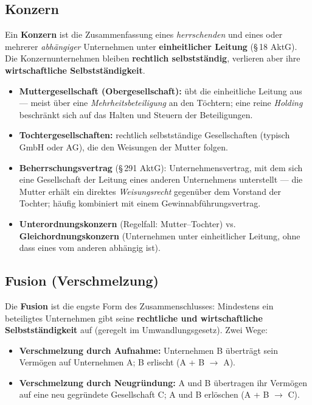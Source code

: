\documentclass[11pt, a4paper]{article}
\begin{document}
\subsection{Konzern}

Ein \textbf{Konzern} ist die Zusammenfassung eines \emph{herrschenden} und eines oder
mehrerer \emph{abhängiger} Unternehmen unter \textbf{einheitlicher Leitung}
(\S\,18 AktG). Die Konzernunternehmen bleiben \textbf{rechtlich selbstständig}, verlieren
aber ihre \textbf{wirtschaftliche Selbstständigkeit}.

\begin{itemize}
  \item \textbf{Muttergesellschaft (Obergesellschaft):} übt die einheitliche Leitung aus
    --- meist über eine \emph{Mehrheitsbeteiligung} an den Töchtern; eine reine
    \emph{Holding} beschränkt sich auf das Halten und Steuern der Beteiligungen.
  \item \textbf{Tochtergesellschaften:} rechtlich selbstständige Gesellschaften
    (typisch GmbH oder AG), die den Weisungen der Mutter folgen.
  \item \textbf{Beherrschungsvertrag} (\S\,291 AktG): Unternehmensvertrag, mit dem sich
    eine Gesellschaft der Leitung eines anderen Unternehmens unterstellt --- die Mutter
    erhält ein direktes \emph{Weisungsrecht} gegenüber dem Vorstand der Tochter; häufig
    kombiniert mit einem Gewinnabführungsvertrag.
  \item \textbf{Unterordnungskonzern} (Regelfall: Mutter--Tochter) vs.
    \textbf{Gleichordnungskonzern} (Unternehmen unter einheitlicher Leitung, ohne dass
    eines vom anderen abhängig ist).
\end{itemize}

\subsection{Fusion (Verschmelzung)}

Die \textbf{Fusion} ist die engste Form des Zusammenschlusses: Mindestens ein beteiligtes
Unternehmen gibt seine \textbf{rechtliche und wirtschaftliche Selbstständigkeit} auf
(geregelt im Umwandlungsgesetz). Zwei Wege:

\begin{itemize}
  \item \textbf{Verschmelzung durch Aufnahme:} Unternehmen B überträgt sein Vermögen auf
    Unternehmen A; B erlischt (A + B $\rightarrow$ A).
  \item \textbf{Verschmelzung durch Neugründung:} A und B übertragen ihr Vermögen auf
    eine neu gegründete Gesellschaft C; A und B erlöschen (A + B $\rightarrow$ C).
\end{itemize}
\end{document}
